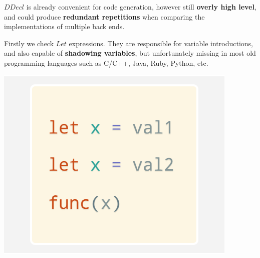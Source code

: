 \documentclass[a1,portrait]{a1poster}
\begin{document}
\begin{multicols}{2}
$DDecl$ is already convenient for code generation, however still \textbf{overly high level}, and could produce
\textbf{redundant repetitions} when comparing the implementations of multiple back ends.


Firstly we check $Let$ expressions. They are responsible for variable introductions,
and also capable of \textbf{shadowing variables}, but unfortunately missing in most old programming languages
such as C/C++, Java, Ruby, Python, etc.

\begin{multicols}{3}

\begin{minipage}[b]{1\linewidth}
\begin{center}\vspace{0.1cm}
\includegraphics[width=0.9\linewidth]{figs/let.png}
\end{center}\vspace{0.1cm}
\end{minipage}


\end{multicols}
\end{multicols}
\end{document}

